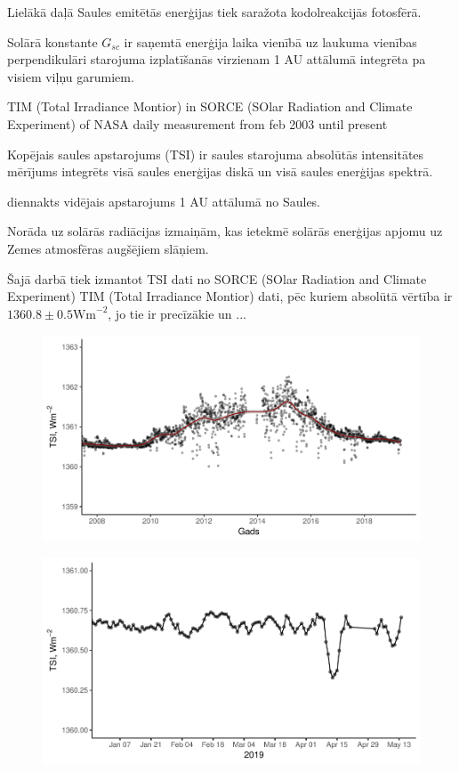 
Lielākā daļā Saules emitētās enerģijas tiek saražota kodolreakcijās fotosfērā.

Solārā konstante $G_{sc}$ ir saņemtā enerģija laika vienībā uz laukuma vienības perpendikulāri starojuma izplatīšanās virzienam 1 AU attālumā integrēta pa visiem viļņu garumiem.\cite{ThermalProcesses}



TIM (Total Irradiance Montior) in SORCE (SOlar Radiation and Climate Experiment) of NASA 
daily measurement from feb 2003 until present


Kopējais saules apstarojums (TSI) ir saules starojuma absolūtās intensitātes mērījums integrēts visā saules enerģijas diskā un visā saules enerģijas spektrā.

diennakts vidējais apstarojums 1 AU attālumā no Saules.

Norāda uz solārās radiācijas izmaiņām, kas ietekmē solārās enerģijas apjomu uz Zemes atmosfēras augšējiem slāņiem.


Šajā darbā tiek izmantot TSI dati no SORCE (SOlar Radiation and Climate Experiment) TIM (Total Irradiance Montior) dati, pēc kuriem absolūtā vērtība ir $1360.8 \pm 0.5 \textrm{Wm}^{-2}$, jo tie ir precīzākie un ...\cite{Frohlich2012}

\begin{figure}
    \centering
    \includegraphics[width=\linewidth]{figures/misc/TSI_8-19.pdf}
    \label{fig:TSI1}
\end{figure}

\begin{figure}
    \centering
    \includegraphics[width=\linewidth]{figures/misc/TSI.pdf}
    \label{fig:TSI2}
\end{figure}